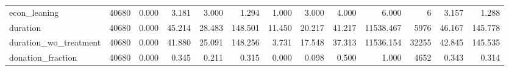 \begin{table}
\begin{tabular}{lrrrrrrrrrrrr}
econ_leaning & 40680 & 0.000 & 3.181 & 3.000 & 1.294 & 1.000 & 3.000 & 4.000 & 6.000 & 6 & 3.157 & 1.288 \\
duration & 40680 & 0.000 & 45.214 & 28.483 & 148.501 & 11.450 & 20.217 & 41.217 & 11538.467 & 5976 & 46.167 & 145.778 \\
duration_wo_treatment & 40680 & 0.000 & 41.880 & 25.091 & 148.256 & 3.731 & 17.548 & 37.313 & 11536.154 & 32255 & 42.845 & 145.535 \\
donation_fraction & 40680 & 0.000 & 0.345 & 0.211 & 0.315 & 0.000 & 0.098 & 0.500 & 1.000 & 4652 & 0.343 & 0.314 \\
\bottomrule
\end{tabular}
\end{table}
